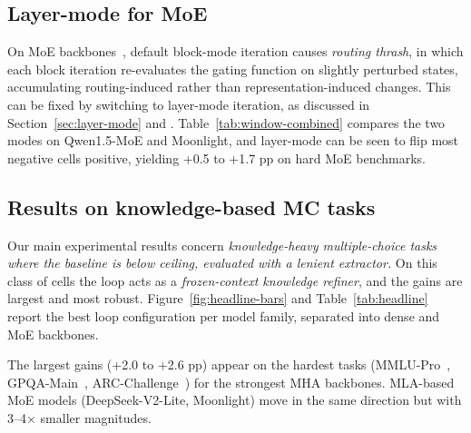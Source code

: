 \subsection{Layer-mode for MoE}
\label{sec:moe-layer}

On MoE backbones~\citep{deepseekv2,moonlight}, default block-mode iteration causes \emph{routing thrash}, in which each block iteration re-evaluates the gating function on slightly perturbed states, accumulating routing-induced rather than representation-induced changes. This can be fixed by switching to layer-mode iteration, as discussed in Section~\ref{sec:layer-mode} and \cite{csordas2024moeut,bae2024relaxed}. Table~\ref{tab:window-combined} compares the two modes on Qwen1.5-MoE and Moonlight, and layer-mode can be seen to flip most negative cells positive, yielding +0.5 to +1.7 pp on hard MoE benchmarks.

\subsection{Results on knowledge-based MC tasks}
\label{sec:headline}

Our main experimental results concern \emph{knowledge-heavy multiple-choice tasks where the baseline is below ceiling, evaluated with a lenient extractor.} On this class of cells the loop acts as a \emph{frozen-context knowledge refiner}, and the gains are largest and most robust. Figure~\ref{fig:headline-bars} and Table~\ref{tab:headline} report the best loop configuration per model family, separated into dense and MoE backbones.

The largest gains (+2.0 to +2.6 pp) appear on the hardest tasks (MMLU-Pro~\citep{wang2024mmlupro}, GPQA-Main~\citep{rein2024gpqa}, ARC-Challenge~\citep{clark2018arc}) for the strongest MHA backbones. MLA-based MoE models (DeepSeek-V2-Lite, Moonlight) move in the same direction but with 3--4$\times$ smaller magnitudes.



